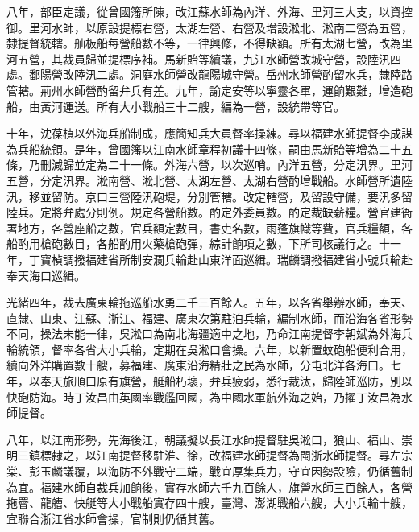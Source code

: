 \begin{pinyinscope}
八年，部臣定議，從曾國籓所陳，改江蘇水師為內洋、外海、里河三大支，以資控御。里河水師，以原設提標右營，太湖左營、右營及增設淞北、淞南二營為五營，隸提督統轄。舢板船每營船數不等，一律興修，不得缺額。所有太湖七營，改為里河五營，其裁員歸並提標序補。馬新貽等續議，九江水師營改城守營，設陸汛四處。鄱陽營改陸汛二處。洞庭水師營改龍陽城守營。岳州水師營酌留水兵，隸陸路管轄。荊州水師營酌留弁兵有差。九年，諭定安等以寧靈各軍，運餉艱難，增造砲船，由黃河運送。所有大小戰船三十二艘，編為一營，設統帶等官。

十年，沈葆楨以外海兵船制成，應簡知兵大員督率操練。尋以福建水師提督李成謀為兵船統領。是年，曾國籓以江南水師章程初議十四條，嗣由馬新貽等增為二十五條，乃刪減歸並定為二十一條。外海六營，以次巡哨。內洋五營，分定汛界。里河五營，分定汛界。淞南營、淞北營、太湖左營、太湖右營酌增戰船。水師營所遺陸汛，移並留防。京口三營陸汛砲堤，分別管轄。改定轄營，及留設守備，要汛多留陸兵。定將弁處分則例。規定各營船數。酌定外委員數。酌定裁缺薪糧。營官建衙署地方，各營座船之數，官兵額定數目，書吏名數，雨蓬旗幟等費，官兵糧額，各船酌用槍砲數目，各船酌用火藥槍砲彈，綜計餉項之數，下所司核議行之。十一年，丁寶楨調撥福建省所制安瀾兵輪赴山東洋面巡緝。瑞麟調撥福建省小號兵輪赴奉天海口巡緝。

光緒四年，裁去廣東輪拖巡船水勇二千三百餘人。五年，以各省舉辦水師，奉天、直隸、山東、江蘇、浙江、福建、廣東次第駐泊兵輪，編制水師，而沿海各省形勢不同，操法未能一律，吳淞口為南北海疆適中之地，乃命江南提督李朝斌為外海兵輪統領，督率各省大小兵輪，定期在吳淞口會操。六年，以新置蚊砲船便利合用，續向外洋購置數十艘，募福建、廣東沿海精壯之民為水師，分屯北洋各海口。七年，以奉天旅順口原有旗營，艇船朽壞，弁兵疲弱，悉行裁汰，歸陸師巡防，別以快砲防海。時丁汝昌由英國率戰艦回國，為中國水軍航外海之始，乃擢丁汝昌為水師提督。

八年，以江南形勢，先海後江，朝議擬以長江水師提督駐吳淞口，狼山、福山、崇明三鎮標隸之，以江南提督移駐淮、徐，改福建水師提督為閩浙水師提督。尋左宗棠、彭玉麟議覆，以海防不外戰守二端，戰宜厚集兵力，守宜因勢設險，仍循舊制為宜。福建水師自裁兵加餉後，實存水師六千九百餘人，旗營水師三百餘人，各營拖罾、龍艚、快艇等大小戰船實存四十艘，臺灣、澎湖戰船六艘，大小兵輪十艘，宜聯合浙江省水師會操，官制則仍循其舊。


\end{pinyinscope}
